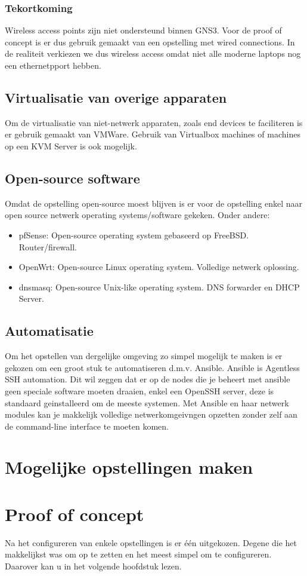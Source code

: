 \subsubsection{Tekortkoming}
Wireless access points zijn niet ondersteund binnen GNS3. Voor de proof of concept is er dus gebruik gemaakt van een opstelling met wired connections. In de realiteit verkiezen we dus wireless access omdat niet alle moderne laptops nog een ethernetpport hebben.   

\subsection{Virtualisatie van overige apparaten}
Om de virtualisatie van niet-netwerk apparaten, zoals end devices te faciliteren is er gebruik gemaakt van VMWare. Gebruik van Virtualbox machines of machines op een KVM Server is ook mogelijk. 


\subsection{Open-source software}
Omdat de opstelling open-source moest blijven is er voor de opstelling enkel naar open source netwerk operating systems/software gekeken. Onder andere:
\begin{itemize}	
	\item pfSense: Open-source operating system gebaseerd op FreeBSD. Router/firewall.
	\item OpenWrt: Open-source Linux operating system. Volledige netwerk oplossing. 
	\item dnsmasq: Open-source Unix-like operating system. DNS forwarder en DHCP Server.
\end{itemize}


\subsection{Automatisatie}

Om het opstellen van dergelijke omgeving zo simpel mogelijk te maken is er gekozen om een groot stuk te automatiseren d.m.v. Ansible. Ansible is Agentless SSH automation. Dit wil zeggen dat er op de nodes die je beheert met ansible geen speciale software moeten draaien, enkel een OpenSSH server, deze is standaard geinstalleerd om de meeste systemen. Met Ansible en haar netwerk modules kan je makkelijk volledige netwerkomgeivngen opzetten zonder zelf aan de command-line interface te moeten komen. 

\section{Mogelijke opstellingen maken}


\section{Proof of concept}
Na het configureren van enkele opstellingen is er \'{e}\'{e}n uitgekozen. Degene die het makkelijkst was om op te zetten en het meest simpel om te  configureren. Daarover kan u in het volgende hoofdstuk lezen.
